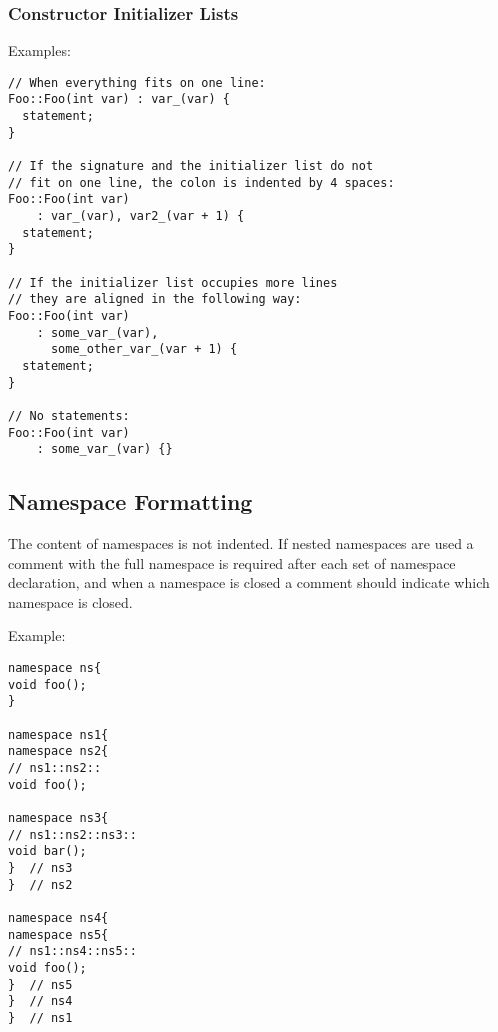 \documentclass[a4paper]{article}
\begin{document}
\subsubsection{Constructor Initializer Lists}

Examples:
\begin{lstlisting}
// When everything fits on one line:
Foo::Foo(int var) : var_(var) {
  statement;
}

// If the signature and the initializer list do not
// fit on one line, the colon is indented by 4 spaces:
Foo::Foo(int var)
    : var_(var), var2_(var + 1) {
  statement;
}

// If the initializer list occupies more lines
// they are aligned in the following way:
Foo::Foo(int var)
    : some_var_(var),
      some_other_var_(var + 1) {
  statement;
}

// No statements:
Foo::Foo(int var)
    : some_var_(var) {}
\end{lstlisting}

\subsection{Namespace Formatting}

The content of namespaces is not indented.
If nested namespaces are used a comment with the full namespace is required after each set of namespace declaration,
and when a namespace is closed a comment should indicate which namespace is closed.

Example:
\begin{lstlisting}
namespace ns{
void foo();
}

namespace ns1{
namespace ns2{
// ns1::ns2::
void foo();

namespace ns3{
// ns1::ns2::ns3::
void bar();
}  // ns3
}  // ns2

namespace ns4{
namespace ns5{
// ns1::ns4::ns5::
void foo();
}  // ns5
}  // ns4
}  // ns1
\end{lstlisting}
\end{document}
